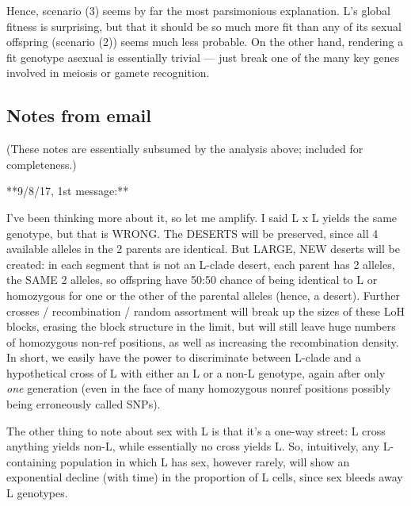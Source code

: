 \documentclass{article}\usepackage[]{graphicx}\usepackage[]{color}
\begin{document}
Hence, scenario (3) seems by far the most parsimonious explanation. L’s global fitness is
surprising, but that it should be so much more fit than any of its sexual offspring (scenario (2))
seems much less probable.  On the other hand, rendering a fit genotype asexual is essentially
trivial --- just break one of the many key genes involved in meiosis or gamete recognition.

\subsection{Notes from email}

(These notes are essentially subsumed by the analysis above; included for completeness.)

**9/8/17, 1st message:**

I’ve been thinking more about it, so let me amplify.  I said L x L yields the same genotype, but
that is WRONG.  The DESERTS will be preserved, since all 4 available alleles in the 2 parents are
identical.  But LARGE, NEW deserts will be created: in each segment that is not an L-clade desert,
each parent has 2 alleles, the SAME 2 alleles, so offspring have 50:50 chance of being identical to
L or homozygous for one or the other of the parental alleles (hence, a desert).  Further crosses /
recombination / random assortment will break up the sizes of these LoH blocks, erasing the block
structure in the limit, but will still leave huge numbers of homozygous non-ref positions, as well
as increasing the recombination density.  In short, we easily have the power to discriminate between
L-clade and a hypothetical cross of L with either an L or a non-L genotype, again after only
\textit{one} generation (even in the face of many homozygous nonref positions possibly being
erroneously called SNPs).

The other thing to note about sex with L is that it’s a one-way street: L cross anything yields
non-L, while essentially no cross yields L.  So, intuitively, any L-containing population in which L
has sex, however rarely, will show an exponential decline (with time) in the proportion of L cells,
since sex bleeds away L genotypes.
\end{document}
